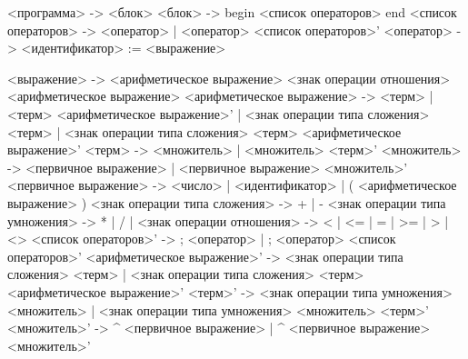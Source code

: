 <программа> -> <блок>
<блок> -> begin <список операторов> end
<список операторов> -> <оператор> | <оператор> <список операторов>'
<оператор> -> <идентификатор> := <выражение>

<выражение> -> <арифметическое выражение> <знак операции отношения> <арифметическое выражение>
<арифметическое выражение> -> <терм> | <терм> <арифметическое выражение>' | <знак операции типа сложения> <терм> | <знак операции типа сложения> <терм> <арифметическое выражение>'
<терм> -> <множитель> | <множитель> <терм>'
<множитель> -> <первичное выражение> | <первичное выражение> <множитель>'
<первичное выражение> -> <число> | <идентификатор> | ( <арифметическое выражение> )
<знак операции типа сложения> -> + | -
<знак операции типа умножения> -> * | / | %
<знак операции отношения> -> < | <= | = | >= | > | <>
<список операторов>' -> ; <оператор> | ; <оператор> <список операторов>'
<арифметическое выражение>' -> <знак операции типа сложения> <терм> | <знак операции типа сложения> <терм> <арифметическое выражение>'
<терм>' -> <знак операции типа умножения> <множитель> | <знак операции типа умножения> <множитель> <терм>'
<множитель>' -> ^ <первичное выражение> | ^ <первичное выражение> <множитель>'